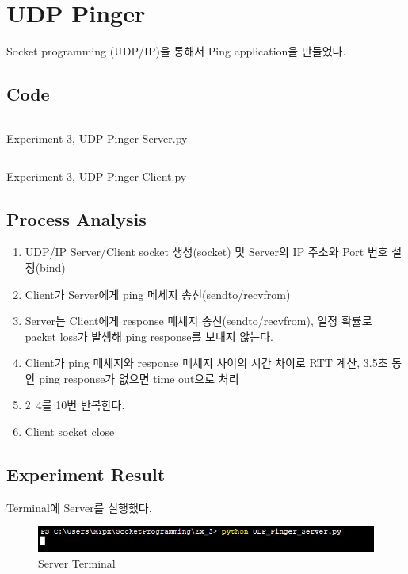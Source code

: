\section{UDP Pinger}
Socket programming (UDP/IP)을 통해서 Ping application을 만들었다.

\subsection{Code}
\vspace{-4mm}
\begin{listing}[h!]
\inputminted[framerule = 1pt,framesep = 2mm , frame = lines, fontsize=\footnotesize]{python}{./code/week09/03/UDP_Pinger_Server.py}
\caption{\footnotesize Experiment 3, UDP Pinger Server.py}
\end{listing}
\clearpage

\vspace{-4mm}
\begin{listing}[h!]
\inputminted[framerule = 1pt,framesep = 2mm , frame = lines, fontsize=\footnotesize]{python}{./code/week09/03/UDP_Pinger_Client.py}
\caption{\footnotesize Experiment 3, UDP Pinger Client.py}
\end{listing}
\clearpage

\subsection{Process Analysis}
\begin{enumerate}
    \item UDP/IP Server/Client socket 생성(socket) 및 Server의 IP 주소와 Port 번호 설정(bind)
    \item Client가 Server에게 ping 메세지 송신(sendto/recvfrom)
    \item Server는 Client에게 response 메세지 송신(sendto/recvfrom), 일정 확률로 packet loss가 발생해 ping response를 보내지 않는다.
    \item Client가 ping 메세지와 response 메세지 사이의 시간 차이로 RTT 계산, 3.5초 동안 ping response가 없으면 time out으로 처리
    \item 2~4를 10번 반복한다.
    \item Client socket close
\end{enumerate}

\subsection{Experiment Result}
Terminal에 Server를 실행했다. \\
\vspace{-4mm}
\begin{figure}[!h]\centering 
	\includegraphics[width=.99\textwidth]{image/week09/3-1.png}
	\caption{\footnotesize
	Server Terminal}
	\vspace{-10pt}
\end{figure}

